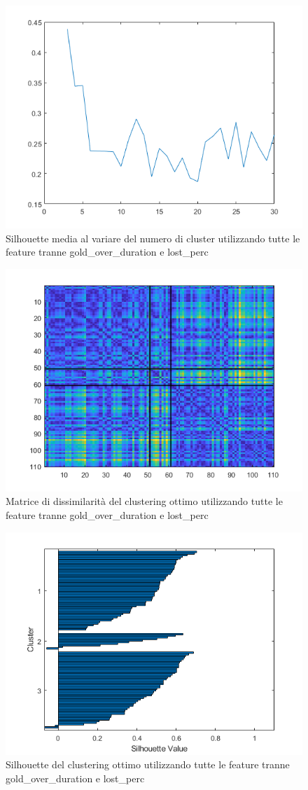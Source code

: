 \documentclass[a4paper,12pt,openany,oneside]{book}
\begin{document}
\begin{figure}[H]
	\centering
	\includegraphics[width=0.8\linewidth]{pics/no8_11/chooseK.png}
	\caption{Silhouette media al variare del numero di cluster utilizzando tutte le feature tranne gold\_over\_duration e lost\_perc}
	\label{fig:chooseK_2}
\end{figure}
\begin{figure}[H]
	\centering
	\includegraphics[width=0.8\linewidth]{pics/no8_11/diss_mat.png}
	\caption{Matrice di dissimilarità del clustering ottimo utilizzando tutte le feature tranne gold\_over\_duration e lost\_perc}
	\label{fig:diss-mat_2}
\end{figure}
\begin{figure}[H]
	\centering
	\includegraphics[width=0.9\linewidth]{pics/no8_11/silhouette.png}
	\caption{Silhouette del clustering ottimo utilizzando tutte le feature tranne gold\_over\_duration e lost\_perc}
	\label{fig:silhouette_2}
\end{figure}
\end{document}
